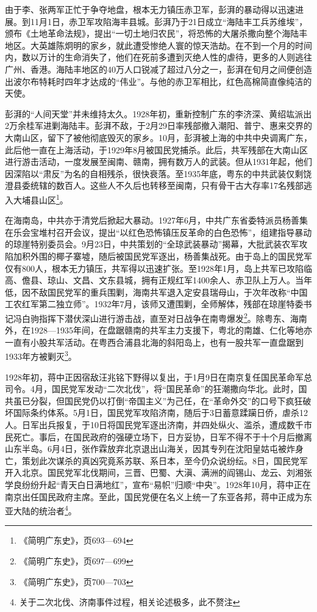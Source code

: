 由于李、张两军正忙于争夺地盘，根本无力镇压赤卫军，彭湃的暴动得以迅速进展。到11月1日，赤卫军攻陷海丰县城。彭湃乃于21日成立“海陆丰工兵苏维埃”，颁布《土地革命法规》，提出“一切土地归农民”，将恐怖的大屠杀撒向整个海陆丰地区。大英雄陈炯明的家乡，就此遭受惨绝人寰的惊天浩劫。在不到一个月的时间内，数以万计的生命消失了，他们在死前多遭到灭绝人性的虐待，更多的人则逃往广州、香港。海陆丰地区的40万人口锐减了超过八分之一，彭湃在旬月之间便创造出波尔布特耗时四年才达成的“伟业”。与他的赤卫军相比，红色高棉简直像纯洁的天使。

彭湃的“人间天堂”并未维持太久。1928年初，重新控制广东的李济深、黄绍竑派出2万余桂军进剿海陆丰。彭湃不敌，于2月29日率残部撤入潮阳、普宁、惠来交界的大南山区，留下了被他彻底毁灭的家乡。10月，彭湃被上海的中共中央调离广东，此后他一直在上海活动，于1929年8月被国民党捕杀。此后，共军残部在大南山区进行游击活动，一度发展至闽南、赣南，拥有数万人的武装。但从1931年起，他们因深陷以“肃反”为名的自相残杀，很快衰落。至1935年底，粤东的中共武装仅剩饶澄县委统辖的数百人。这些人不久后也转移至闽南，只有骨干古大存率17名残部逃入大埔县山区\footnote{《简明广东史》，页693—694}。

在海南岛，中共亦于清党后掀起大暴动。1927年6月，中共广东省委特派员杨善集在乐会宝堆村召开会议，提出“以红色恐怖镇压反革命的白色恐怖”，组建指导暴动的琼崖特别委员会。9月23日，中共策划的“全琼武装暴动”揭幕，大批武装农军攻陷加积外围的椰子寨墟，随后被国民党军逐出，杨善集战死。由于岛上的国民党军仅有800人，根本无力镇压，共军得以迅速扩张。至1928年1月，岛上共军已攻陷临高、儋县、琼山、文昌、文东县城，拥有正规红军1400余人、赤卫队上万人。当年低，因不敌国民党军的重兵围剿，海南共军退入定安县瑞母山，于次年改称“中国工农红军第二独立师”。1932年7月，该师又遭围剿，全师解体，残部在琼崖特委书记冯白驹指挥下潜伏深山进行游击战，直至对日战争在南粤爆发\footnote{《简明广东史》，页697—699}。除粤东、海南外，在1928—1935年间，在盘踞赣南的共军主力支援下，粤北的南雄、仁化等地亦一直有小股共军活动。在粤西合浦县北海的斜阳岛上，也有一股共军一直盘踞到1933年方被剿灭\footnote{《简明广东史》，页700—703}。

1928年初，蒋中正因宿敌汪兆铭下野得以复出，于1月9日在南京复任国民革命军总司令。4月，国民党军发动“二次北伐”，将“国民革命”的狂潮撒向华北。此时，国共虽已分裂，但国民党仍以打倒“帝国主义”为己任，在“革命外交”的口号下疯狂破坏国际条约体系。5月1日，国民党军攻陷济南，随后于3日蓄意蹂躏日侨，虐杀12人。日军出兵报复，于10日将国民党军逐出济南，并四处纵火、滥杀，遭成数千市民死亡。事后，在国民政府的强硬立场下，日方妥协，日军不得不于十个月后撤离山东半岛。6月4日，张作霖放弃北京退出山海关，因其专列在沈阳皇姑屯被炸身亡，策划此次谋杀的真凶究竟系苏联、系日本，至今仍众说纷纭。8日，国民党军开入北京。国民党军北伐期间，三晋、巴蜀、大滇、满洲的阎锡山、龙云、刘湘张学良纷纷升起“青天白日满地红”，宣布“易帜”归顺“中央”。1928年10月，蒋中正在南京出任国民政府主席。至此，国民党便在名义上统一了东亚各邦，蒋中正成为东亚大陆的统治者\footnote{关于二次北伐、济南事件过程，相关论述极多，此不赘注}。

